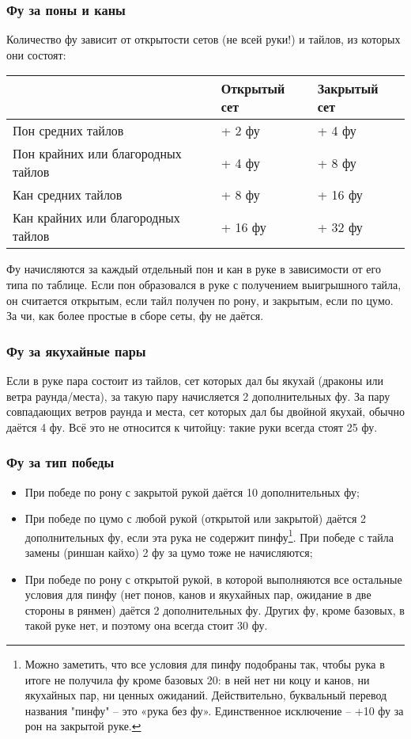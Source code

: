 \subsubsection{Фу за поны и каны}

Количество фу зависит от открытости сетов (не всей руки!) и тайлов, из которых они состоят:

\begin{tabular}{|L{7cm}|C{3cm}|C{3cm}|}
	\hline
	& Открытый сет &
	Закрытый сет \\
	\hline
	Пон средних тайлов &
	+ 2 фу &
	+ 4 фу \\
	\hline
	Пон крайних или благородных тайлов &
	+ 4 фу &
	+ 8 фу \\
	\hline
	Кан средних тайлов &
	+ 8 фу &
	+ 16 фу \\
	\hline
	Кан крайних или благородных тайлов &
	+ 16 фу &
	+ 32 фу \\
	\hline
\end{tabular}

Фу начисляются за каждый отдельный пон и кан в руке в зависимости от его типа по таблице. Если пон образовался в руке с получением выигрышного тайла, он считается открытым, если тайл получен по рону, и закрытым, если по цумо. За чи, как более простые в сборе сеты, фу не даётся.

\subsubsection{Фу за якухайные пары}

Если в руке пара состоит из тайлов, сет которых дал бы якухай (драконы или ветра раунда/места), за такую пару начисляется 2 дополнительных фу. За пару совпадающих ветров раунда и места, сет которых дал бы двойной якухай, обычно даётся 4 фу. Всё это не относится к читойцу: такие руки всегда стоят 25 фу.

\subsubsection{Фу за тип победы}

\begin{itemize}
	\item При победе по рону с закрытой рукой даётся 10 дополнительных фу;
	\item При победе по цумо с любой рукой (открытой или закрытой) даётся 2 дополнительных фу, если эта рука не содержит пинфу\footnote{Можно заметить, что все условия для пинфу подобраны так, чтобы рука в итоге не получила фу кроме базовых 20: в ней нет ни коцу и канов, ни якухайных пар, ни ценных ожиданий. Действительно, буквальный перевод названия "пинфу" – это «рука без фу». Единственное исключение – +10 фу за рон на закрытой руке.}. При победе с тайла замены (риншан кайхо) 2 фу за цумо тоже не начисляются;
	\item При победе по рону с открытой рукой, в которой выполняются все остальные условия для пинфу (нет понов, канов и якухайных пар, ожидание в две стороны в рянмен) даётся 2 дополнительных фу. Других фу, кроме базовых, в такой руке нет, и поэтому она всегда стоит 30 фу.
\end{itemize}

